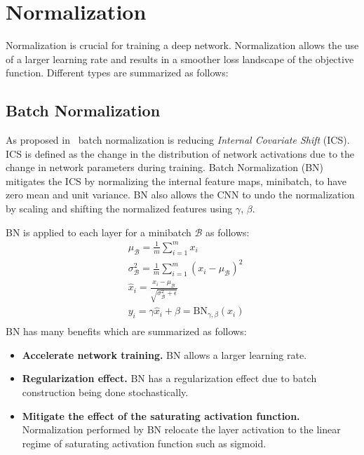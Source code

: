 \section{Normalization}
Normalization is crucial for training a deep network. Normalization allows the use of a larger learning rate and results in a smoother loss landscape of the objective function. Different types are summarized as follows:
\subsection{Batch Normalization}
As proposed in~\cite{ioffe2015batch} batch normalization is reducing {\em  Internal Covariate Shift} (ICS). ICS is defined as the change in the distribution of network activations due to the change in network parameters during training. Batch Normalization (BN) mitigates the ICS by normalizing the internal feature maps, minibatch, to have zero mean and unit variance. BN also allows the CNN to undo the normalization by scaling and shifting the normalized features using $\gamma$, $\beta$. 

BN is applied to each layer for a minibatch $\mathcal{B}$ as follows:
\begin{equation}
\begin{split}
    & \mu_{\mathcal{B}} = \frac{1}{m}\sum^{m}_{i=1}x_{i}\\
    &  \sigma^{2}_{\mathcal{B}} = \frac{1}{m}\sum^{m}_{i=1}\left(x_{i}-\mu_{\mathcal{B}}\right)^{2}\\
    &  \hat{x}_{i} = \frac{x_{i} - \mu_{\mathcal{B}}}{\sqrt{\sigma^{2}_{\mathcal{B}}+\epsilon}} \\
    &  y_{i} = \gamma\hat{x}_{i} + \beta = \text{BN}_{\gamma, \beta}\left(x_{i}\right) \\
\end{split}
\end{equation}
BN has many benefits which are summarized as follows:
\begin{itemize}
    \item \textbf{Accelerate network training.} BN allows a larger learning rate.
    \item \textbf{Regularization effect.} BN has a regularization effect due to batch construction being done stochastically.
    \item \textbf{Mitigate the effect of the saturating activation function.} Normalization performed by BN relocate the layer activation to the linear regime of saturating activation function such as sigmoid.
\end{itemize}

